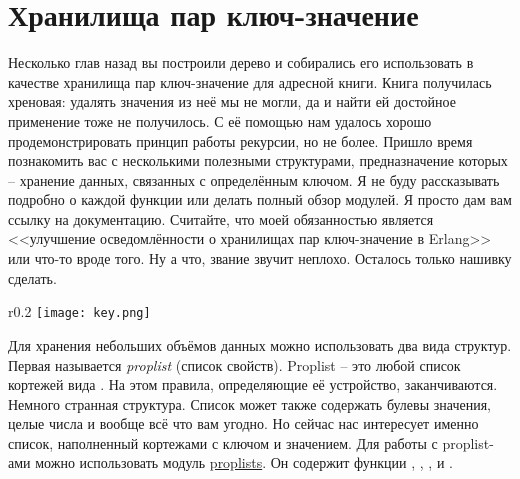 \section{Хранилища пар ключ\--значение}
\label{key-value-stores}
Несколько глав назад вы построили дерево и собирались его использовать в качестве хранилища пар ключ\--значение для адресной книги.
Книга получилась хреновая: удалять значения из неё мы не могли, да и найти ей достойное применение тоже не получилось.
С её помощью нам удалось хорошо продемонстрировать принцип работы рекурсии, но не более.
Пришло время познакомить вас с несколькими полезными структурами, предназначение которых \--- хранение данных, связанных с определённым ключом.
Я не буду рассказывать подробно о каждой функции или делать полный обзор модулей.
Я просто дам вам ссылку на документацию.
Считайте, что моей обязанностью является <<улучшение осведомлённости о хранилищах пар ключ\--значение в Erlang>> или что\--то вроде того.
Ну а что, звание звучит неплохо.
Осталось только нашивку сделать.
\begin{wrapfigure}{r}{0.2\linewidth}
    \texttt{[image: key.png]}
\end{wrapfigure}

Для хранения небольших объёмов данных можно использовать два вида структур.
Первая называется \emph{proplist} (список свойств).
Proplist \--- это любой список кортежей вида .
На этом правила, определяющие её устройство, заканчиваются.
Немного странная структура.
Список может также содержать булевы значения, целые числа и вообще всё что вам угодно.
Но сейчас нас интересует именно список, наполненный кортежами с ключом и значением.
Для работы с proplist\--ами можно использовать модуль \href{http://erldocs.com/R15B/stdlib/proplists.html}{proplists}.
Он содержит функции , , ,  и .

